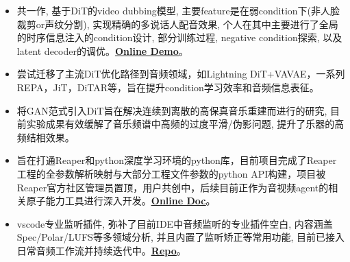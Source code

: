 \documentclass{resume}
\begin{document}
\begin{itemize}[parsep=0.2ex]
  \item 共一作, 基于DiT的video dubbing模型, 主要feature是在弱condition下(非人脸裁剪or声纹分割), 实现精确的多说话人配音效果, 个人在其中主要进行了全局的时序信息注入的condition设计, 部分训练过程, negative condition探索, 以及latent decoder的调优。\textbf{\href{https://cinedub2026.github.io/}{\uline{Online Demo}}}。
\end{itemize}

\begin{itemize}[parsep=0.2ex]
  \item 尝试迁移了主流DiT优化路径到音频领域，如Lightning DiT+VAVAE，一系列REPA，JiT，DiTAR等，旨在提升condition学习效率和音频信息表征。
  \item 将GAN范式引入DiT旨在解决连续到离散的高保真音乐重建而进行的研究, 目前实验成果有效缓解了音乐频谱中高频的过度平滑/伪影问题, 提升了乐器的高频结相效果。
\end{itemize}

\begin{itemize}[parsep=0.2ex]
  \item 旨在打通Reaper和python深度学习环境的python库，目前项目完成了Reaper工程的全参数解析映射与大部分工程文件参数的python API构建，项目被Reaper官方社区管理员置顶，用户共创中，后续目前正作为音视频agent的相关原子能力工具进行深入开发。\textbf{\href{https://dddpg.github.io/ReaperDoc/}{\uline{Online Doc}}}。
\end{itemize}


\begin{itemize}[parsep=0.2ex]
  \item vscode专业监听插件, 弥补了目前IDE中音频监听的专业插件空白, 内容涵盖Spec/Polar/LUFS等多领域分析, 并且内置了监听矫正等常用功能, 目前已接入日常音频工作流并持续迭代中。\textbf{\href{https://github.com/Eps-Acoustic-Revolution-Lab/EAR-Audio-Preview}{\uline{Repo}}}。
\end{itemize}
\end{document}
